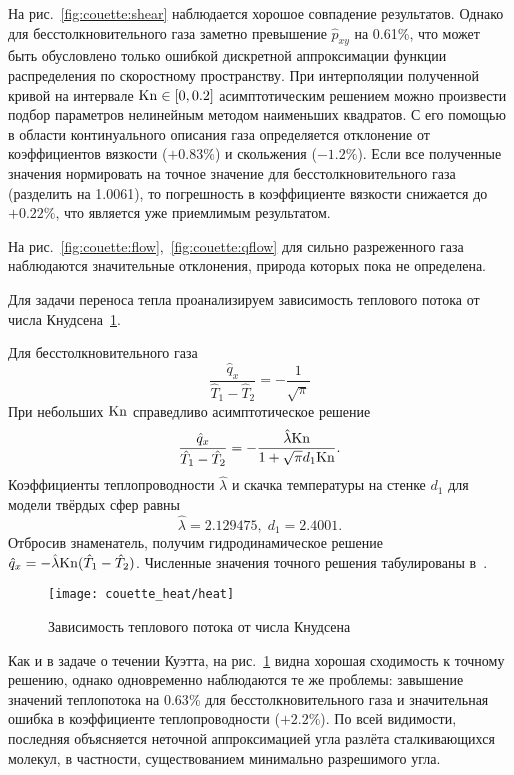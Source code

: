 На рис.~\ref{fig:couette:shear} наблюдается хорошое совпадение результатов.
Однако для бесстолкновительного газа заметно превышение \(\hat{p}_{xy}\) на 0.61\%,
что может быть обусловлено только ошибкой дискретной аппроксимации функции распределения по скоростному пространству.
При интерполяции полученной кривой на интервале \(\mathrm{Kn}\in[0,0.2]\) асимптотическим решением
можно произвести подбор параметров нелинейным методом наименьших квадратов.
С его помощью в области континуального описания газа определяется отклонение
от коэффициентов вязкости (\(+0.83\%\)) и скольжения (\(-1.2\%\)).
Если все полученные значения нормировать на точное значение для бесстолкновительного газа (разделить на 1.0061),
то погрешность в коэффициенте вязкости снижается до \(+0.22\%\), что является уже приемлимым результатом.

На рис.~\ref{fig:couette:flow},~\ref{fig:couette:qflow} для сильно разреженного газа наблюдаются
значительные отклонения, природа которых пока не определена.

Для задачи переноса тепла проанализируем зависимость теплового потока от числа Кнудсена~\ref{fig:heat}.

Для бесстолкновительного газа
\[ \frac{\hat{q}_x}{\hat{T}_1-\hat{T}_2} = -\frac1{\sqrt{\pi}} \]
При небольших \(\mathrm{Kn}\) справедливо асимптотическое решение
\[ \frac{\hat{q}_x}{\hat{T}_1-\hat{T}_2} = -\frac{\hat{\lambda}\mathrm{Kn}}{1+\sqrt{\pi}d_1\mathrm{Kn}}. \]
Коэффициенты теплопроводности \(\hat{\lambda}\) и скачка температуры на стенке \(d_1\) для модели твёрдых сфер равны~\cite{Sone2007}
\[ \hat{\lambda} = 2.129475, \; d_1 = 2.4001. \]
Отбросив знаменатель, получим гидродинамическое решение \(\hat{q}_x = -\hat{\lambda}\mathrm{Kn}(\hat{T}_1-\hat{T}_2)\).
Численные значения точного решения табулированы в~\cite{Sone2007}.

\begin{figure}
    \centering
    \texttt{[image: couette\_heat/heat]}
    \caption{Зависимость теплового потока от числа Кнудсена}\label{fig:heat}
\end{figure}

Как и в задаче о течении Куэтта, на рис.~\ref{fig:heat} видна хорошая сходимость к точному решению,
однако одновременно наблюдаются те же проблемы: завышение значений теплопотока на \(0.63\)\%
для бесстолкновительного газа и значительная ошибка в коэффициенте теплопроводности (\(+2.2\%\)).
По всей видимости, последняя объясняется неточной аппроксимацией угла разлёта сталкивающихся молекул,
в частности, существованием минимально разрешимого угла.

